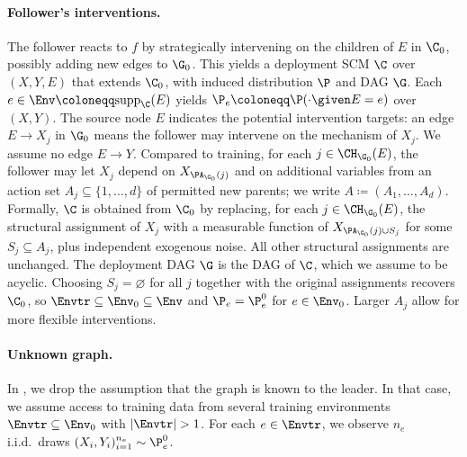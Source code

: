 \paragraph{Follower's interventions.} 
The follower reacts to $f$ by strategically intervening on the children of
$E$ in $\C_0$, possibly adding new edges to $\G_0$. This yields a
deployment SCM $\C$ over $(X, Y, E)$ that extends $\C_0$, with induced
distribution $\P$ and DAG $\G$. Each $e \in \Env \coloneqq
\mathrm{supp}_{\C}(E)$ yields $\P_e \coloneqq \P(\cdot \given E = e)$
over $(X, Y)$. The source node $E$ indicates the potential intervention targets: an edge $E \to X_j$ in $\G_0$ means the follower may intervene on
the mechanism of $X_j$. We assume no edge $E \to Y$. Compared to training, for each $j \in \CH_{\G_0}(E)$, the follower may let $X_j$ depend on $X_{\PA_{\G_0}(j)}$ and on additional variables from an action set $A_j \subseteq \{1, \ldots, d\}$ of permitted new parents; we write
$A \coloneqq (A_1, \ldots, A_d)$.
Formally, $\C$ is obtained from $\C_0$ by replacing, for each
$j \in \CH_{\G_0}(E)$, the structural assignment of $X_j$ with a
measurable function of $X_{\PA_{\G_0}(j) \cup S_j}$ for some
$S_j \subseteq A_j$, plus independent exogenous noise. All other structural assignments are unchanged. The deployment DAG $\G$ is the DAG
of $\C$, which we assume to be acyclic. Choosing $S_j = \varnothing$ for
all $j$ together with the original assignments recovers $\C_0$, so
$\Envtr \subseteq \Env_0 \subseteq \Env$ and $\P_e = \P^0_e$ for
$e \in \Env_0$. Larger $A_j$ allow for more flexible interventions.


\paragraph{Unknown graph.}
In , we drop the assumption that the graph
is known to the leader. In that case, 
we assume access to training data 
from several training environments $\Envtr \subseteq \Env_0$ with $|\Envtr| > 1$. 
For each $e \in \Envtr$, we observe $n_e$ i.i.d.\ draws $(X_i, Y_i)_{i=1}^{n_e} \sim \P_e^0$. 

